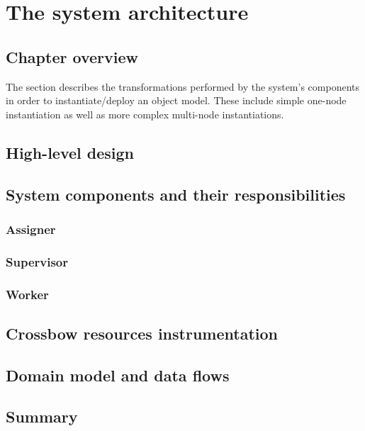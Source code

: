 \documentclass[11pt]{book}
\begin{document}
  \chapter{The system architecture}

    \section*{Chapter overview}

      The  section describes the transformations performed by the system's components in order to instantiate/deploy an object model. These include simple one-node instantiation as well as more complex multi-node instantiations.



    \section{High-level design}


    \section{System components and their responsibilities}

      \subsection{Assigner}

      \subsection{Supervisor}

      \subsection{Worker}


    \section{Crossbow resources instrumentation}


    \section{Domain model and data flows} \label{sec:domain-model}


    \section*{Summary}
\end{document}
